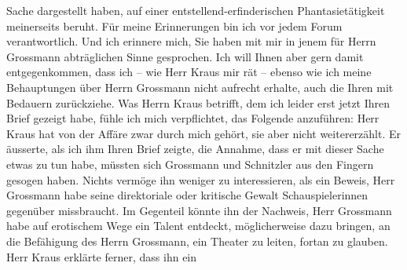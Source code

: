 \begin{ledgroupsized}[t]{13cm}
                    Sache dargestellt haben, auf einer entstellend-erfinderischen Phantasietätigkeit
                    meinerseits beruht. Für meine Erinnerungen bin ich vor jedem Forum
                    verantwortlich. Und ich erinnere mich, Sie haben mit mir in jenem für Herrn Grossmann abträglichen Sinne gesprochen. Ich
                    will Ihnen aber gern damit entgegenkommen, dass ich – wie Herr Kraus mir rät – ebenso wie ich meine Behauptungen über
                    Herrn Grossmann nicht aufrecht erhalte, auch
                    die Ihren mit Bedauern zurückziehe.\pend
           \pstart
           Was Herrn Kraus betrifft, dem ich leider erst
                    jetzt Ihren Brief gezeigt habe, fühle ich mich verpflichtet, das Folgende
                    anzuführen: Herr Kraus hat von der Affäre
                    zwar durch mich gehört, sie aber nicht weitererzählt. Er äusserte, als ich ihm
                    Ihren Brief zeigte, die Annahme, dass er mit dieser Sache etwas zu tun habe,
                    müssten sich Grossmann und Schnitzler aus
                    den Fingern gesogen haben. Nichts vermöge ihn weniger zu interessieren, als ein
                    Beweis, Herr Grossmann habe seine
                    direktoriale oder kritische Gewalt Schauspielerinnen gegenüber missbraucht. Im
                    Gegenteil könnte ihn der Nachweis, Herr Grossmann habe auf erotischem Wege ein Talent entdeckt, möglicherweise
                    dazu bringen, an die Befähigung des Herrn Grossmann, ein Theater zu leiten, fortan zu glauben. Herr Kraus erklärte ferner, dass ihn ein

\end{ledgroupsized}
